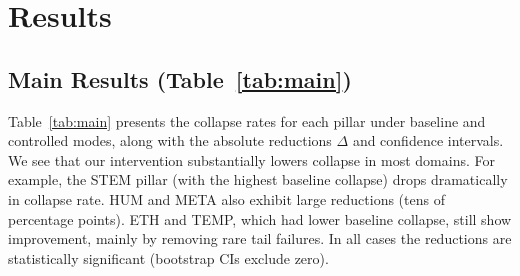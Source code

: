 \documentclass{article}
\begin{document}
\section{Results}
\subsection{Main Results (Table~\ref{tab:main})}
Table~\ref{tab:main} presents the collapse rates for each pillar under baseline and controlled modes, along with the absolute reductions $\Delta$ and confidence intervals. We see that our intervention substantially lowers collapse in most domains. For example, the STEM pillar (with the highest baseline collapse) drops dramatically in collapse rate. HUM and META also exhibit large reductions (tens of percentage points). ETH and TEMP, which had lower baseline collapse, still show improvement, mainly by removing rare tail failures. In all cases the reductions are statistically significant (bootstrap CIs exclude zero).

\begin{table}[t]
\centering
\scriptsize
\setlength{\tabcolsep}{2.5pt}
\caption{Collapse reduction across five pillars under baseline vs.\ controlled decoding (Gemma~7B, Ollama, 512 tokens fixed).
Rates show Wilson 95\% CIs; $\Delta$/RR/OR use paired bootstrap over seeds (B=20{,}000). We define $\Delta$ as (controlled $-$ baseline), so negative $\Delta$ indicates reduced collapse under control.}
\label{tab:main}
\end{table}
\end{document}
